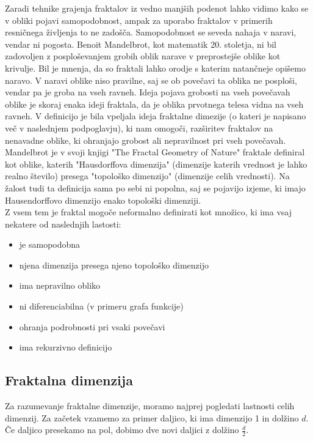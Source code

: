 \documentclass[a4paper, 12px]{article}
\begin{document}
        \addvspace{0.5cm}
        Zaradi tehnike grajenja fraktalov iz vedno manjših podenot lahko vidimo kako se v obliki pojavi samopodobnost, ampak za uporabo fraktalov v primerih resničnega življenja to ne zadošča.
        Samopodobnost se seveda nahaja v naravi, vendar ni pogosta.
        Benoit Mandelbrot, kot matematik 20. stoletja, ni bil zadovoljen z posploševanjem grobih oblik narave v preprostejše oblike kot krivulje.
        Bil je mnenja, da so fraktali lahko orodje s katerim natančneje opišemo naravo.
        V naravi oblike niso pravilne, saj se ob povečavi ta oblika ne posploši, vendar pa je groba na vseh ravneh.
        Ideja pojava grobosti na vseh povečavah oblike je skoraj enaka ideji fraktala, da je oblika prvotnega telesa vidna na vseh ravneh.
        V definicijo je bila vpeljala ideja fraktalne dimezije (o kateri je napisano več v naslednjem podpoglavju), ki nam omogoči, razširitev fraktalov na nenavadne oblike, ki ohranjajo grobost ali nepravilnost pri vseh povečavah.
        Mandelbrot je v svoji knjigi "The Fractal Geometry of Nature" fraktale definiral kot oblike, katerih "Hausdorffova dimenzija" (dimenzije katerih vrednost je lahko realno število) presega "topološko dimenzijo" (dimenzije celih vrednosti).
        Na žalost tudi ta definicija sama po sebi ni popolna, saj se pojavijo izjeme, ki imajo Hausendorffovo dimenzijo enako topološki dimenziji.
        \cite{FractalDefinitionVideo}
        \cite{HausdorffDimension}\\

        Z vsem tem je fraktal mogoče neformalno definirati kot množico, ki ima vsaj nekatere od naslednjih lastosti:
        \cite{irvsic2015fraktalna}
        \begin{itemize}
            \item je samopodobna
            \item njena dimenzija presega njeno topološko dimenzijo
            \item ima nepravilno obliko
            \item ni diferenciabilna (v primeru grafa funkcije)
            \item ohranja podrobnosti pri vsaki povečavi
            \item ima rekurzivno definicijo
        \end{itemize}

    \subsection{Fraktalna dimenzija}
        Za razumevanje fraktalne dimenzije, moramo najprej pogledati lastnosti celih dimenzij.
        Za začetek vzamemo za primer daljico, ki ima dimenzijo 1 in dolžino $d$.
        Če daljico presekamo na pol, dobimo dve novi daljici z dolžino $\frac{d}{2}$.
        
\end{document}
